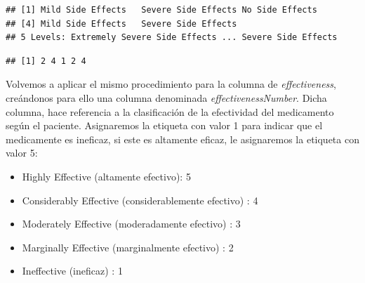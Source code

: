 \documentclass[spanish,]{article}
\newenvironment{Shaded}{\begin{snugshade}}{\end{snugshade}}
\newcommand{\KeywordTok}[1]{\textcolor[rgb]{0.13,0.29,0.53}{\textbf{#1}}}
\newcommand{\DecValTok}[1]{\textcolor[rgb]{0.00,0.00,0.81}{#1}}
\newcommand{\OperatorTok}[1]{\textcolor[rgb]{0.81,0.36,0.00}{\textbf{#1}}}
\newcommand{\NormalTok}[1]{#1}
\providecommand{\tightlist}{%
  \setlength{\itemsep}{0pt}\setlength{\parskip}{0pt}}
\begin{document}
\begin{verbatim}
## [1] Mild Side Effects   Severe Side Effects No Side Effects    
## [4] Mild Side Effects   Severe Side Effects
## 5 Levels: Extremely Severe Side Effects ... Severe Side Effects
\end{verbatim}

\begin{Shaded}
\end{Shaded}

\begin{verbatim}
## [1] 2 4 1 2 4
\end{verbatim}

Volvemos a aplicar el mismo procedimiento para la columna de
\emph{effectiveness}, creándonos para ello una columna denominada
\emph{effectivenessNumber}. Dicha columna, hace referencia a la
clasificación de la efectividad del medicamento según el paciente.
Asignaremos la etiqueta con valor 1 para indicar que el medicamente es
ineficaz, si este es altamente eficaz, le asignaremos la etiqueta con
valor 5:

\begin{itemize}
\tightlist
\item
  Highly Effective (altamente efectivo): 5
\item
  Considerably Effective (considerablemente efectivo) : 4
\item
  Moderately Effective (moderadamente efectivo) : 3
\item
  Marginally Effective (marginalmente efectivo) : 2
\item
  Ineffective (ineficaz) : 1
\end{itemize}
\end{document}

